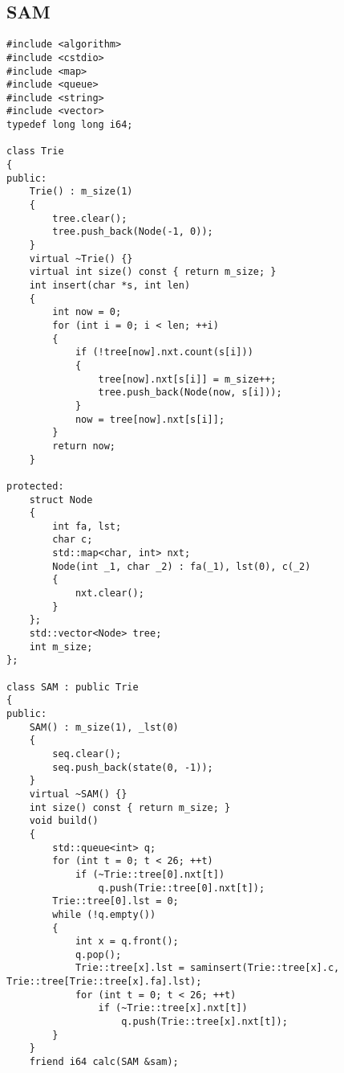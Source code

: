 \documentclass{ctexbook}  %
\begin{document}
\subsection{SAM}
\lstset{basicstyle=	tfamily}
\begin{Verbatim}[fontsize=\small]
#include <algorithm>
#include <cstdio>
#include <map>
#include <queue>
#include <string>
#include <vector>
typedef long long i64;

class Trie
{
public:
    Trie() : m_size(1)
    {
        tree.clear();
        tree.push_back(Node(-1, 0));
    }
    virtual ~Trie() {}
    virtual int size() const { return m_size; }
    int insert(char *s, int len)
    {
        int now = 0;
        for (int i = 0; i < len; ++i)
        {
            if (!tree[now].nxt.count(s[i]))
            {
                tree[now].nxt[s[i]] = m_size++;
                tree.push_back(Node(now, s[i]));
            }
            now = tree[now].nxt[s[i]];
        }
        return now;
    }

protected:
    struct Node
    {
        int fa, lst;
        char c;
        std::map<char, int> nxt;
        Node(int _1, char _2) : fa(_1), lst(0), c(_2)
        {
            nxt.clear();
        }
    };
    std::vector<Node> tree;
    int m_size;
};

class SAM : public Trie
{
public:
    SAM() : m_size(1), _lst(0)
    {
        seq.clear();
        seq.push_back(state(0, -1));
    }
    virtual ~SAM() {}
    int size() const { return m_size; }
    void build()
    {
        std::queue<int> q;
        for (int t = 0; t < 26; ++t)
            if (~Trie::tree[0].nxt[t])
                q.push(Trie::tree[0].nxt[t]);
        Trie::tree[0].lst = 0;
        while (!q.empty())
        {
            int x = q.front();
            q.pop();
            Trie::tree[x].lst = saminsert(Trie::tree[x].c, Trie::tree[Trie::tree[x].fa].lst);
            for (int t = 0; t < 26; ++t)
                if (~Trie::tree[x].nxt[t])
                    q.push(Trie::tree[x].nxt[t]);
        }
    }
    friend i64 calc(SAM &sam);


\end{Verbatim}
\end{document}
